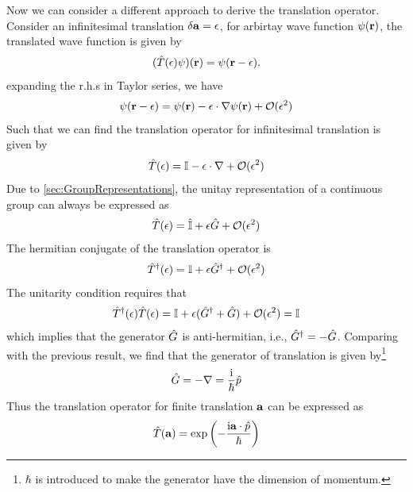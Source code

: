 Now we can consider a different approach to derive the translation operator. Consider an infinitesimal translation $\delta \mathbf{a} = \mathbf{\epsilon}$, for arbirtay wave function $\psi(\mathbf{r})$, the translated wave function is given by
\begin{align}
    (\hat{T}(\mathbf{\epsilon})\psi)(\mathbf{r}) = \psi(\mathbf{r}-\mathbf{\epsilon}).
\end{align}
expanding the r.h.s in Taylor series, we have
\begin{align}
    \psi(\mathbf{r}-\mathbf{\epsilon}) = \psi(\mathbf{r}) - \mathbf{\epsilon} \cdot \nabla \psi(\mathbf{r}) + \mathcal{O}(\epsilon^2) 
\end{align}
Such that we can find the translation operator for infinitesimal translation is given by
\begin{align}
    \hat{T}(\mathbf{\epsilon}) = \mathbb{I} - \mathbf{\epsilon} \cdot \nabla + \mathcal{O}(\epsilon^2)
\end{align}
Due to \cref{sec:GroupRepresentations}, the unitay representation of a continuous group can always be expressed as 
\begin{align}
    \hat{T}(\epsilon) =\hat{\mathbb{I}} + \epsilon \hat G + \mathcal{O}(\epsilon^2)
\end{align}
The hermitian conjugate of the translation operator is 
\begin{align}
    \hat{T}^ \dag(\mathbf{\epsilon}) = \mathbb{I} + \mathbf{\epsilon} \hat G^ \dag+ \mathcal{O}(\epsilon^2)
\end{align}
The unitarity condition requires that
\begin{align}
    \hat{T}^ \dag(\mathbf{\epsilon}) \hat{T}(\mathbf{\epsilon}) = \mathbb{I} + \mathbf{\epsilon} (\hat G^ \dag + \hat G) + \mathcal{O}(\epsilon^2) = \mathbb{I}
\end{align}
which implies that the generator $\hat G$ is anti-hermitian, i.e., $\hat G^ \dag = - \hat G$. Comparing with the previous result, we find that the generator of translation is given by\footnote{$\hbar$ is introduced to make the generator have the dimension of momentum.}
\begin{align}
    \hat G = - \nabla = \frac{\mathrm{i}}{\hbar} \hat{p}
\end{align}
Thus the translation operator for finite translation $\mathbf{a}$ can be expressed as
\begin{align}
    \hat{T}(\mathbf{a}) = \exp \left(- \frac{\mathrm{i} \mathbf{a} \cdot \hat{p}}{\hbar}\right)
\end{align}
\newpage
